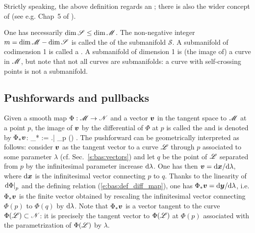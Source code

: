 \begin{remark}
Strictly speaking, the above definition regards an
;
there is also the wider concept of  (see e.g. Chap~5 of \cite{Lee13}).
\end{remark}


One has necessarily $\dim \mathscr{S} \leq \dim \mathscr{M}$. The non-negative integer
$m = \dim\mathscr{M} - \dim\mathscr{S}$ is called the 
of the submanifold $\mathscr{S}$. A submanifold of codimension 1 is called
a . A submanifold of dimension 1 is
(the image of) a curve in $\mathscr{M}$, but note that not all curves are submanifolds:
a curve with self-crossing points is not a submanifold.

\subsection{Pushforwards and pullbacks} \label{s:bas:push_pull}

Given a smooth map $\Phi: \mathscr{M}\to\mathscr{N}$ and a vector $\bm{v}$ in the tangent
space to $\mathscr{M}$ at a point $p$, the image of $\bm{v}$ by the differential
of $\Phi$ at $p$ is called the 
and is denoted by $\Phi_* \bm{v}$:
\be \label{e:bas:def_pushforward}
    \Phi_*  := \left.\D\Phi \right| _p () .
\ee
The pushforward can be geometrically interpreted as follows:
consider $\bm{v}$ as the tangent vector
to a curve $\mathscr{L}$ through $p$ associated to some parameter $\lambda$ (cf. Sec.~\ref{s:bas:vectors})
and let $q$ be
the point of $\mathscr{L}$ separated from $p$ by the infinitesimal parameter increase $\mathrm{d}\lambda$.
One has then $\bm{v} = \mathrm{d}\bm{x} / \mathrm{d}\lambda$, where $\mathrm{d}\bm{x}$ is the infinitesimal
vector connecting $p$ to $q$. Thanks to the linearity of $\left.\mathrm{d}\Phi \right| _p$
and the defining relation (\ref{e:bas:def_diff_map}), one has
$\Phi_* \bm{v} = \mathrm{d}\bm{y} / \mathrm{d}\lambda$, i.e. $\Phi_* \bm{v}$ is the finite vector obtained
by rescaling the infinitesimal vector connecting $\Phi(p)$ to $\Phi(q)$ by $\mathrm{d}\lambda$. Note that
$\Phi_* \bm{v}$ is a vector tangent to the curve $\Phi(\mathscr{L})\subset \mathscr{N}$: it is precisely
the tangent vector to $\Phi(\mathscr{L})$ at $\Phi(p)$ associated with the parametrization of $\Phi(\mathscr{L})$
by $\lambda$.

